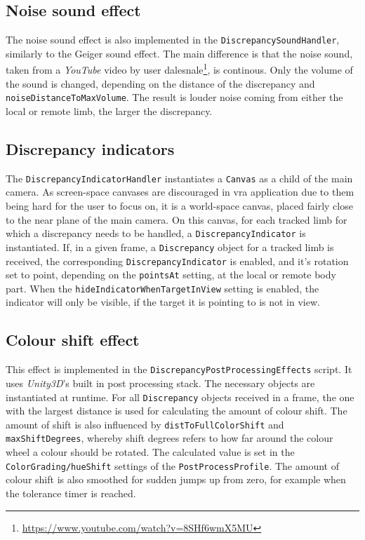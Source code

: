 \subsection{Noise sound effect}

The noise sound effect is also implemented in the \texttt{DiscrepancySoundHandler}, similarly to the Geiger sound effect. The main difference is that the noise sound, taken from a \textit{YouTube} video by user dalesnale\footnote{\url{https://www.youtube.com/watch?v=8SHf6wmX5MU}}, is continous. Only the volume of the sound is changed, depending on the distance of the discrepancy and \texttt{noiseDistanceToMaxVolume}.
\newline
The result is louder noise coming from either the local or remote limb, the larger the discrepancy.


\subsection{Discrepancy indicators}

The \texttt{DiscrepancyIndicatorHandler} instantiates a \texttt{Canvas} as a child of the main camera. As screen-space canvases are discouraged in \gls{vra} application due to them being hard for the user to focus on, it is a world-space canvas, placed fairly close to the near plane of the main camera.
\newline
On this canvas, for each tracked limb for which a discrepancy needs to be handled, a \texttt{DiscrepancyIndicator} is instantiated. If, in a given frame, a \texttt{Discrepancy} object for a tracked limb is received, the corresponding \texttt{DiscrepancyIndicator} is enabled, and it's rotation set to point, depending on the \texttt{pointsAt} setting, at the local or remote body part.
\newline
When the \texttt{hideIndicatorWhenTargetInView} setting is enabled, the indicator will only be visible, if the target it is pointing to is not in view.


\subsection{Colour shift effect}

\begin{sloppypar}
This effect is implemented in the \texttt{DiscrepancyPostProcessingEffects} script. It uses \textit{Unity3D}'s built in post processing stack. The necessary objects are instantiated at runtime. For all \texttt{Discrepancy} objects received in a frame, the one with the largest distance is used for calculating the amount of colour shift. The amount of shift is also influenced by \texttt{distToFullColorShift} and \texttt{maxShiftDegrees}, whereby shift degrees refers to how far around the colour wheel a colour should be rotated. The calculated value is set in the \texttt{ColorGrading/hueShift} settings of the \texttt{PostProcessProfile}.
\newline
The amount of colour shift is also smoothed for sudden jumps up from zero, for example when the tolerance timer is reached.
\end{sloppypar}



